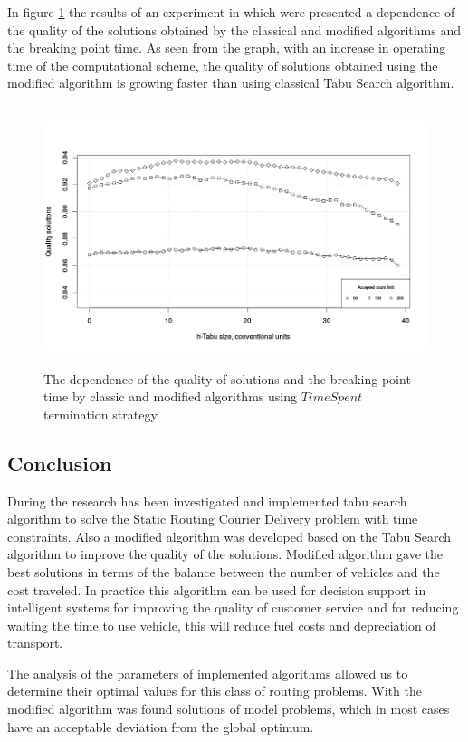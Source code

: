\documentclass[]{TAACpaper}
\begin{document}
 In figure \ref{aba:fig5} the results of an experiment in which  were presented a dependence of the quality of the solutions obtained by the classical and modified algorithms and  the breaking point time. As seen from the graph, with an increase in operating time of the computational scheme, the quality of solutions obtained using the modified algorithm is growing faster than using classical Tabu Search algorithm.
 
 \begin{figure}[h]
 	\hfil\includegraphics[height=3.0in]{images/tabuSize_time.png}\hfil
 	\caption
 	{
 		The dependence of the quality of solutions and  the breaking point time by classic and modified algorithms using $ TimeSpent $ termination strategy
 	}
 	\label{aba:fig5}
 \end{figure}
 
 
\subsection{Conclusion}
During the research has been investigated and implemented tabu search algorithm to solve the Static Routing Courier Delivery problem with time constraints. Also a modified algorithm was developed  based on the Tabu Search algorithm to improve the quality of the solutions. Modified algorithm gave the best solutions in terms of the balance between the number of vehicles and the cost traveled.  In practice this algorithm can be used for decision support in intelligent systems for improving the quality of customer service and for reducing waiting the time to use vehicle, this will reduce fuel costs and depreciation of transport.

The analysis of the parameters of implemented algorithms allowed us to determine their optimal values for this class of routing problems. With the modified algorithm was found solutions of model problems, which in most cases have an acceptable deviation from the global optimum.
\end{document}
